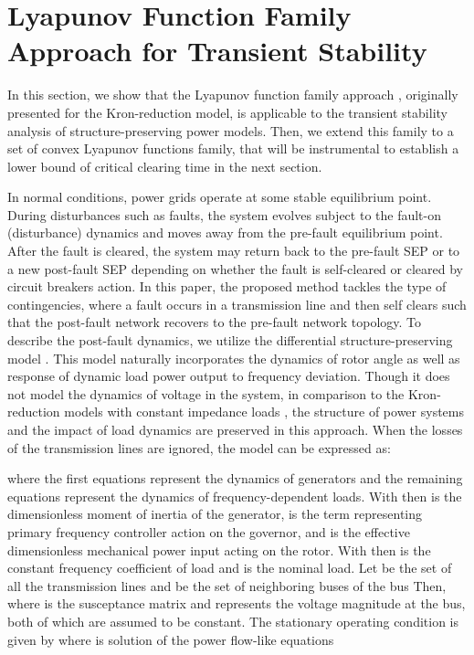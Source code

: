\documentclass[final]{IEEEtran}
\begin{document}
\section{Lyapunov Function Family Approach for Transient Stability}
\label{sec:LFF}

In this section, we show that the Lyapunov function family
approach \cite{Vu:2014}, originally presented for the
Kron-reduction model, is applicable to the transient stability
analysis of structure-preserving power models. Then, we extend
this family to a set of convex Lyapunov functions family, that
will be instrumental to establish a lower bound of critical
clearing time in the next section.

In normal conditions, power grids operate at some stable
equilibrium point. During disturbances such as faults, the system
evolves subject to the fault-on (disturbance) dynamics and moves
away from the pre-fault equilibrium point.  After the fault is
cleared, the system may return back to the pre-fault SEP or to a
new post-fault SEP depending on whether the fault is self-cleared
or cleared by circuit breakers action. In this paper, the proposed
method tackles the type of contingencies, where a fault occurs in
a transmission line and then self clears such that the post-fault
network recovers to the pre-fault network topology. To describe
the  post-fault dynamics, we utilize the differential
structure-preserving model \cite{bergen1981structure}. This model
naturally incorporates the dynamics of rotor angle as well as
response of dynamic load power output to frequency deviation.
Though it does not model the dynamics of voltage in the system, in
comparison to the Kron-reduction models with constant impedance
loads \cite{386159}, the structure of power systems and the impact
of load dynamics are preserved in this approach. When the losses
of the transmission lines are ignored, the model can be expressed
as:

where the first  equations represent the dynamics of generators
and the remaining  equations represent the dynamics of
frequency-dependent loads. With  then  is the
dimensionless moment of inertia of the  generator, 
is the term representing primary frequency controller action on
the governor, and  is the effective dimensionless
mechanical power input acting on the rotor. With 
then  is the constant frequency coefficient of load and
 is the nominal load. Let  be the set of
all the transmission lines and  be the set of
neighboring buses of the bus  Then,
 where 
is the  susceptance matrix and
  represents the voltage magnitude at the  bus, both of which are assumed to be constant. The
stationary operating condition is given by
 where  is
solution of the power flow-like equations
\end{document}
